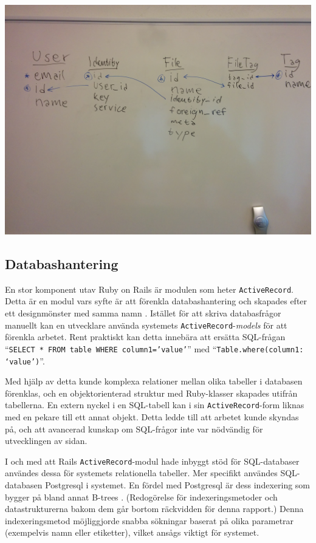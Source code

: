 \begin{Figure}
  \centering
    \includegraphics[width=0.8\linewidth]{figures/relations.jpg}
\end{Figure}

\subsection{Databashantering}
En stor komponent utav Ruby on Rails är modulen som heter \texttt{ActiveRecord}. Detta är en modul vars syfte är att förenkla databashantering \cite{objrel} och skapades efter ett designmönster med samma namn \cite{proar}. Istället för att skriva databasfrågor manuellt kan en utvecklare använda systemets \texttt{ActiveRecord}-\textit{models} för att förenkla arbetet. Rent praktiskt kan detta innebära att ersätta SQL-frågan “\texttt{SELECT * FROM table WHERE column1=’value’}” med “\texttt{Table.where(column1: ‘value’)}”.

Med hjälp av detta kunde komplexa relationer mellan olika tabeller i databasen förenklas, och en objektorienterad struktur med Ruby-klasser skapades utifrån tabellerna. En extern nyckel i en SQL-tabell kan i sin \texttt{ActiveRecord}-form liknas med en pekare till ett annat objekt. Detta ledde till att arbetet kunde skyndas på, och att avancerad kunskap om SQL-frågor inte var nödvändig för utvecklingen av sidan.

I och med att Rails \texttt{ActiveRecord}-modul hade inbyggt stöd för SQL-databaser användes dessa för systemets relationella tabeller. Mer specifikt användes SQL-databasen Postgresql i systemet. En fördel med Postgresql är dess indexering som bygger på bland annat B-trees \cite{indexes}. (Redogörelse för indexeringsmetoder och datastrukturerna bakom dem går bortom räckvidden för denna rapport.) Denna indexeringsmetod möjliggjorde snabba sökningar baserat på olika parametrar (exempelvis namn eller etiketter), vilket ansågs viktigt för systemet.

